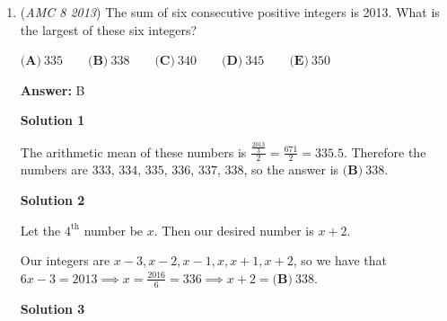 \begin{enumerate}
 \textbf{Answer: }E



\textbf{Solution 1: Algebra}

We multiply the first ratio by 8 on both sides, and the second ratio by 5 to get the same number for 8th graders, in order that we can put the two ratios together:

 $5:3 = 5(8):3(8) = 40:24$
$8:5 = 8(5):5(5) = 40:25$

 Therefore, the ratio of 8th graders to 7th graders to 6th graders is $40:25:24$. Since the ratio is in lowest terms, the smallest number of students participating in the project is $40+25+24 = \boxed{\textbf{(E)}\ 89}$.

 



\textbf{Solution 2: Fakesolving}

The number of 8th graders has to be a multiple of 8 and 5, so assume it is 40 (the smallest possibility). Then there are $40*\frac{3}{5}=24$ 6th graders and $40*\frac{5}{8}=25$ 7th graders. The numbers of students is $40+24+25=\boxed{\textbf{(E)}\ 89}$



	\item (\textit{AMC 8 2013}) The sum of six consecutive positive integers is 2013. What is the largest of these six integers?


 $\textbf{(A)}\ 335 \qquad \textbf{(B)}\ 338 \qquad \textbf{(C)}\ 340 \qquad \textbf{(D)}\ 345 \qquad \textbf{(E)}\ 350$

 \textbf{Answer: }B



\textbf{Solution 1}

The arithmetic mean of these numbers is $\frac{\frac{2013}{3}}{2}=\frac{671}{2}=335.5$. Therefore the numbers are $333$, $334$, $335$, $336$, $337$, $338$, so the answer is $\boxed{\textbf{(B)}\ 338}$.

 



\textbf{Solution 2}

Let the $4^{\text{th}}$ number be $x$. Then our desired number is $x+2$. 

 Our integers are $x-3,x-2,x-1,x,x+1,x+2$, so we have that $6x-3 = 2013 \implies x = \frac{2016}{6} = 336 \implies x+2 = \boxed{\textbf{(B)}\ 338}$.

 



\textbf{Solution 3}


\end{enumerate}
